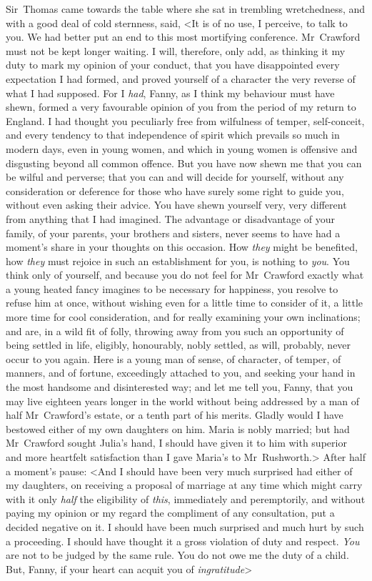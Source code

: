 Sir~Thomas came towards the table where she sat in trembling wretchedness, and with a good deal of cold sternness, said, <It is of no use, I perceive, to talk to you. We had better put an end to this most mortifying conference. Mr~Crawford must not be kept longer waiting. I will, therefore, only add, as thinking it my duty to mark my opinion of your conduct, that you have disappointed every expectation I had formed, and proved yourself of a character the very reverse of what I had supposed. For I \textit{had}, Fanny, as I think my behaviour must have shewn, formed a very favourable opinion of you from the period of my return to England. I had thought you peculiarly free from wilfulness of temper, self-conceit, and every tendency to that independence of spirit which prevails so much in modern days, even in young women, and which in young women is offensive and disgusting beyond all common offence. But you have now shewn me that you can be wilful and perverse; that you can and will decide for yourself, without any consideration or deference for those who have surely some right to guide you, without even asking their advice. You have shewn yourself very, very different from anything that I had imagined. The advantage or disadvantage of your family, of your parents, your brothers and sisters, never seems to have had a moment's share in your thoughts on this occasion. How \textit{they}  might be benefited, how \textit{they}  must rejoice in such an establishment for you, is nothing to \textit{you}. You think only of yourself, and because you do not feel for Mr~Crawford exactly what a young heated fancy imagines to be necessary for happiness, you resolve to refuse him at once, without wishing even for a little time to consider of it, a little more time for cool consideration, and for really examining your own inclinations; and are, in a wild fit of folly, throwing away from you such an opportunity of being settled in life, eligibly, honourably, nobly settled, as will, probably, never occur to you again. Here is a young man of sense, of character, of temper, of manners, and of fortune, exceedingly attached to you, and seeking your hand in the most handsome and disinterested way; and let me tell you, Fanny, that you may live eighteen years longer in the world without being addressed by a man of half Mr~Crawford's estate, or a tenth part of his merits. Gladly would I have bestowed either of my own daughters on him. Maria is nobly married; but had Mr~Crawford sought Julia's hand, I should have given it to him with superior and more heartfelt satisfaction than I gave Maria's to Mr~Rushworth.> After half a moment's pause: <And I should have been very much surprised had either of my daughters, on receiving a proposal of marriage at any time which might carry with it only \textit{half}  the eligibility of \textit{this}, immediately and peremptorily, and without paying my opinion or my regard the compliment of any consultation, put a decided negative on it. I should have been much surprised and much hurt by such a proceeding. I should have thought it a gross violation of duty and respect. \textit{You}  are not to be judged by the same rule. You do not owe me the duty of a child. But, Fanny, if your heart can acquit you of \textit{ingratitude}\longdash>

